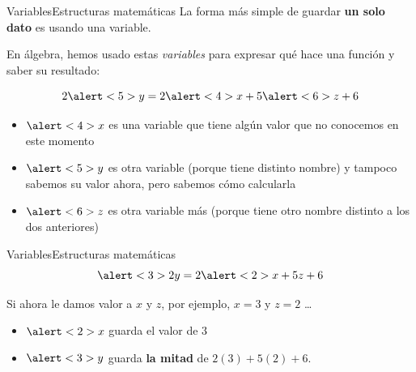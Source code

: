 \documentclass[spanish, c]{beamer}
\begin{document}
\begin{frame}{Variables}{Estructuras matemáticas}
    La forma más simple de guardar \textbf{un solo dato} es usando una \alert{variable}. \pause

    En álgebra, hemos usado estas \textit{variables} para expresar qué hace una función y saber su resultado: \pause

    $$2\alert<5>{y} = 2\alert<4>{x} + 5\alert<6>{z} + 6$$ \pause

    \begin{itemize}
        \item $\alert<4>{x}$ es una variable que tiene algún valor que no conocemos en este momento
        \item $\alert<5>{y}$ es otra variable (porque tiene distinto nombre) y tampoco sabemos su valor ahora, pero sabemos cómo calcularla
        \item $\alert<6>{z}$ es otra variable más (porque tiene otro nombre distinto a los dos anteriores)
    \end{itemize}

\end{frame}

\begin{frame}[t]{Variables}{Estructuras matemáticas}    
    $$\alert<3>{2y} = 2\alert<2>{x} + 5{z} + 6$$

    \bigskip

    Si ahora le damos valor a $x$ y $z$, por ejemplo, $x = 3$ y $z = 2$ \dots \pause

    \bigskip

    \begin{itemize}
        \itemsep1.7ex
        \item $\alert<2>{x}$ guarda el valor de $3$
        \item $\alert<3>{y}$ guarda \textbf{la mitad} de $2(3) + 5(2) + 6$.
    \end{itemize}

\end{frame}
\end{document}
